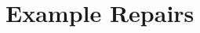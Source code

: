\documentclass[runningheads]{llncs}
\begin{document}
%

%
%
%
  
  \clearpage

  \pagebreak\appendix

  \section{Example Repairs}\label{sec:exaple_repairs}

\end{document}
